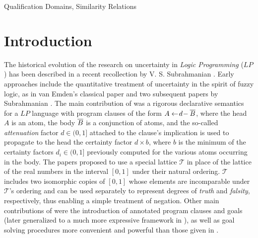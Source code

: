 \documentclass{sigplanconf}
\newcommand{\SL}{\mathcal{T}} \newcommand{\GL}{\mathcal{G}}
\theoremstyle{definition}
\theoremstyle{plain}
\begin{document}
\keywords
Qualification Domains, Similarity Relations

\section{Introduction} \label{Introduction}

The historical evolution of the research on uncertainty in {\em Logic Programming} ($LP$) has been described in a recent recollection by V. S. Subrahmanian \cite{Sub07}. Early approaches include the quantitative  treatment of uncertainty in the spirit of fuzzy logic, as in van Emden's classical paper \cite{VE86} and two subsequent papers by Subrahmanian \cite{Sub87,Sub88}. The main contribution of \cite{VE86} was a rigorous declarative semantics for a $LP$ language with program clauses  of the form $A \gets\!d\!- \overline{B}$, where the head $A$ is an atom, the body $\overline{B}$ is a conjunction of atoms, and the so-called {\em attenuation} factor $d \in (0,1]$ attached to the clause's implication is used to propagate
to the head the certainty factor $d \times b$, where $b$ is the minimum of the certainty factors $d_i \in (0,1]$ previously computed for the various atoms occurring in the body. The papers \cite{Sub87,Sub88} proposed to use a special lattice $\SL$ in place of the lattice of the real numbers in the interval $[0,1]$ under their natural ordering. $\SL$ includes two isomorphic copies of $[0,1]$ whose elements are incomparable under $\SL$'s ordering and can be used separately to represent degrees of {\em truth} and {\em falsity}, respectively, thus enabling a simple treatment of
negation. Other main contributions of \cite{Sub87,Sub88} were the introduction of annotated program clauses and goals (later generalized to a much more expressive framework in \cite{KS92}), as well as goal solving procedures more convenient and powerful than those given in \cite{VE86}.
\end{document}
